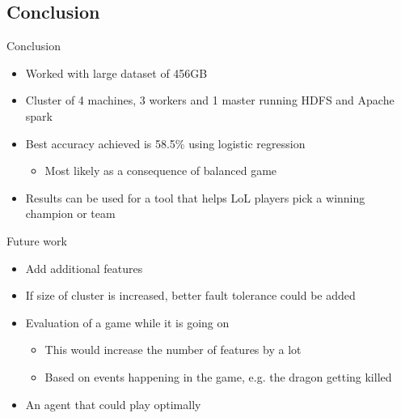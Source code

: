 \subsection{Conclusion}
\label{sec-1-3}
\begin{frame}[label=sec-1-3-1]{Conclusion}
\begin{itemize}
\item Worked with large dataset of 456GB
\item Cluster of 4 machines, 3 workers and 1 master running HDFS and Apache spark
\item Best accuracy achieved is 58.5\% using logistic regression
\begin{itemize}
\item Most likely as a consequence of balanced game
\end{itemize}
\item Results can be used for a tool that helps LoL players pick a winning champion or team
\end{itemize}
\end{frame}
\begin{frame}[label=sec-1-3-2]{Future work}
\begin{itemize}
\item Add additional features
\item If size of cluster is increased, better fault tolerance could be added
\item Evaluation of a game while it is going on
\begin{itemize}
\item This would increase the number of features by a lot
\item Based on events happening in the game, e.g. the dragon getting killed
\end{itemize}
\item An agent that could play optimally
\end{itemize}
\end{frame}